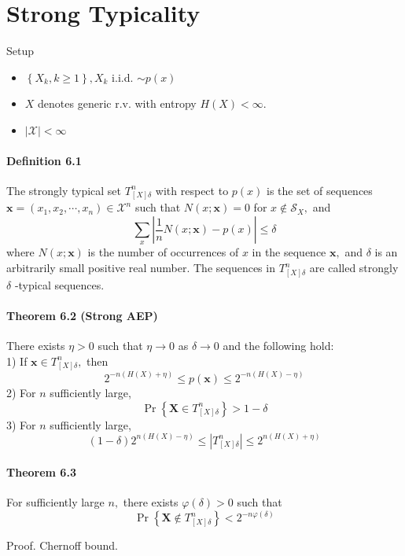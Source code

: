 \documentclass[8pt]{article}
\begin{document}
\section{Strong Typicality}
Setup
\begin{itemize}
	\item $\left\{X_{k}, k \geq 1\right\}, X_{k}$ i.i.d. $\sim p(x)$
	\item $X$ denotes generic $\mathrm{r}$.v. with entropy $H(X)<\infty$.
	\item $|\mathcal{X}|<\infty$
\end{itemize}

\begin{tcolorbox}
\paragraph{Definition 6.1} The strongly typical set $T_{[X] \delta}^{n}$ with respect to $p(x)$ is the set of sequences $\mathbf{x}=\left(x_{1}, x_{2}, \cdots, x_{n}\right) \in \mathcal{X}^{n}$ such that $N(x ; \mathbf{x})=0$ for $x \notin \mathcal{S}_{X},$ and
$$
\sum_{x}\left|\frac{1}{n} N(x ; \mathbf{x})-p(x)\right| \leq \delta
$$
where $N(x ; \mathbf{x})$ is the number of occurrences of $x$ in the sequence $\mathbf{x},$ and $\delta$ is an arbitrarily small positive real number. The sequences in $T_{[X] \delta}^{n}$ are called strongly $\delta$ -typical sequences.
\end{tcolorbox}

\begin{tcolorbox}
\paragraph{Theorem 6.2 (Strong AEP)} There exists $\eta>0$ such that $\eta \rightarrow 0$ as $\delta \rightarrow 0$ and the following hold: \\
1) If $\mathbf{x} \in T_{[X] \delta}^{n},$ then
$$
2^{-n(H(X)+\eta)} \leq p(\mathbf{x}) \leq 2^{-n(H(X)-\eta)}
$$
2) For $n$ sufficiently large,
$$
\operatorname{Pr}\left\{\mathbf{X} \in T_{[X] \delta}^{n}\right\}>1-\delta
$$
3) For $n$ sufficiently large,
$$
(1-\delta) 2^{n(H(X)-\eta)} \leq\left|T_{[X] \delta}^{n}\right| \leq 2^{n(H(X)+\eta)}
$$
\end{tcolorbox}

\begin{tcolorbox}
\paragraph{Theorem 6.3} For sufficiently large $n,$ there exists $\varphi(\delta)>0$ such that
$$
\operatorname{Pr}\left\{\mathbf{X} \notin T_{[X] \delta}^{n}\right\}<2^{-n \varphi(\delta)}
$$
\end{tcolorbox}
Proof. Chernoff bound.
\end{document}
